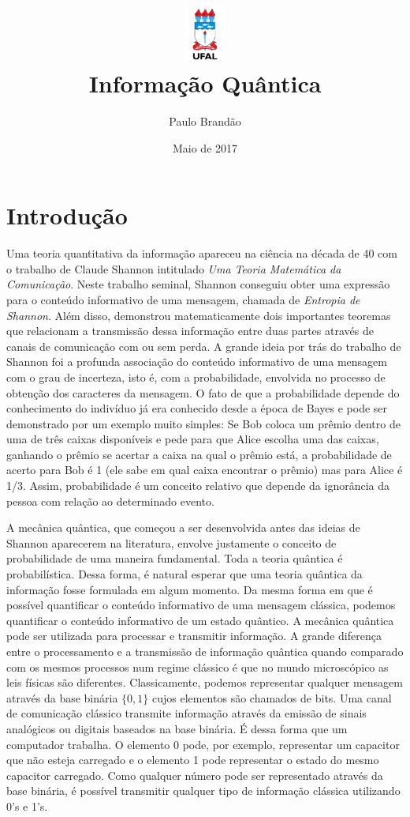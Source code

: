 \documentclass{article}
\title{\includegraphics[width=0.1\textwidth]{ufallogo.png} \\
\Huge{\color{astral}\textbf{Informação Quântica}}}
\author{Paulo Brandão}
\date{Maio de 2017}
\begin{document}
\maketitle

\section{Introdução}

Uma teoria quantitativa da informação apareceu na ciência na década de 40 com o trabalho de Claude Shannon intitulado \textit{Uma Teoria Matemática da Comunicação}. Neste trabalho seminal, Shannon conseguiu obter uma expressão para o conteúdo informativo de uma mensagem, chamada de \textit{Entropia de Shannon}. Além disso, demonstrou matematicamente dois importantes teoremas que relacionam a transmissão dessa informação entre duas partes através de canais de comunicação com ou sem perda. A grande ideia por trás do trabalho de Shannon foi a profunda associação do conteúdo informativo de uma mensagem com o grau de incerteza, isto é, com a probabilidade, envolvida no processo de obtenção dos caracteres da mensagem. O fato de que a probabilidade depende do conhecimento do indivíduo já era conhecido desde a época de Bayes e pode ser demonstrado por um exemplo muito simples: Se Bob coloca um prêmio dentro de uma de três caixas disponíveis e pede para que Alice escolha uma das caixas, ganhando o prêmio se acertar a caixa na qual o prêmio está, a probabilidade de acerto para Bob é 1 (ele sabe em qual caixa encontrar o prêmio) mas para Alice é 1/3. Assim, probabilidade é um conceito relativo que depende da ignorância da pessoa com relação ao determinado evento.

A mecânica quântica, que começou a ser desenvolvida antes das ideias de Shannon aparecerem na literatura, envolve justamente o conceito de probabilidade de uma maneira fundamental. Toda a teoria quântica é probabilística. Dessa forma, é natural esperar que uma teoria quântica da informação fosse formulada em algum momento. Da mesma forma em que é possível quantificar o conteúdo informativo de uma mensagem clássica, podemos quantificar o conteúdo informativo de um estado quântico. A mecânica quântica pode ser utilizada para processar e transmitir informação. A grande diferença entre o processamento e a transmissão de informação quântica quando comparado com os mesmos processos num regime clássico é que no mundo microscópico as leis físicas são diferentes. Classicamente, podemos representar qualquer mensagem através da base binária $\{ 0,1 \}$ cujos elementos são chamados de bits. Uma canal de comunicação clássico transmite informação através da emissão de sinais analógicos ou digitais baseados na base binária. É dessa forma que um computador trabalha. O elemento 0 pode, por exemplo, representar um capacitor que não esteja carregado e o elemento 1 pode representar o estado do mesmo capacitor carregado. Como qualquer número pode ser representado através da base binária, é possível transmitir qualquer tipo de informação clássica utilizando 0's e 1's.
\end{document}
